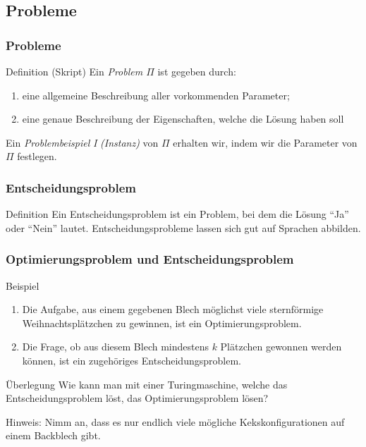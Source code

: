 \subsection{Probleme}
\begin{frame}
 \frametitle{Probleme}
 \begin{block}{Definition (Skript)}
 Ein \emph{Problem $\Pi$} ist gegeben durch:
 \begin{enumerate}
  \item eine allgemeine Beschreibung aller vorkommenden Parameter;
  \item eine genaue Beschreibung der Eigenschaften, welche die Lösung haben soll
 \end{enumerate}
 \end{block}
 Ein \emph{Problembeispiel} \textit{I} \emph{(Instanz)} von $\Pi$ erhalten wir, indem wir die Parameter von $\Pi$ festlegen.
\end{frame}

\begin{frame}
 \frametitle{Entscheidungsproblem}
 \begin{block}{Definition}
  Ein Entscheidungsproblem ist ein Problem, bei dem die Lösung "`Ja"' oder "`Nein"' lautet. 
  Entscheidungsprobleme lassen sich gut auf Sprachen abbilden.
 \end{block}
\end{frame}

\begin{frame}
 \frametitle{Optimierungsproblem und Entscheidungsproblem}
 \begin{block}{Beispiel}
  \begin{enumerate}
   \item Die Aufgabe, aus einem gegebenen Blech möglichst viele sternförmige Weihnachtsplätzchen zu gewinnen, ist ein Optimierungsproblem.
   \item Die Frage, ob aus diesem Blech mindestens $k$ Plätzchen gewonnen werden können, ist ein zugehöriges Entscheidungsproblem.
  \end{enumerate}
 \end{block}
 \begin{block}{Überlegung}
  Wie kann man mit einer Turingmaschine, welche das Entscheidungsproblem löst, das Optimierungsproblem lösen?
 \end{block}
 Hinweis: Nimm an, dass es nur endlich viele mögliche Kekskonfigurationen auf einem Backblech gibt.
\end{frame}


